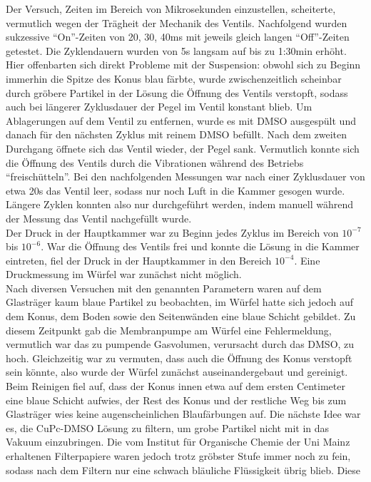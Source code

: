 Der Versuch, Zeiten im Bereich von Mikrosekunden einzustellen, scheiterte, vermutlich wegen der Trägheit der
Mechanik des Ventils. Nachfolgend wurden sukzessive "`On"'-Zeiten von 20, 30, 40ms mit jeweils gleich langen
"`Off"'-Zeiten getestet. Die Zyklendauern wurden von 5s langsam auf bis zu 1:30min erhöht. Hier offenbarten
sich direkt Probleme mit der Suspension: obwohl sich zu Beginn immerhin die Spitze des Konus blau färbte,
wurde zwischenzeitlich scheinbar durch gröbere Partikel in der Lösung die Öffnung des Ventils verstopft,
sodass auch bei längerer Zyklusdauer der Pegel im Ventil konstant blieb. Um Ablagerungen auf dem Ventil zu
entfernen, wurde es mit DMSO ausgespült und danach für den nächsten Zyklus mit reinem DMSO befüllt. Nach dem
zweiten Durchgang öffnete sich das Ventil wieder, der Pegel sank. Vermutlich konnte sich die Öffnung des
Ventils durch die Vibrationen während des Betriebs "`freischütteln"'. Bei den nachfolgenden Messungen war
nach einer Zyklusdauer von etwa 20s das Ventil leer, sodass nur noch Luft in die Kammer gesogen wurde. Längere
Zyklen konnten also nur durchgeführt werden, indem manuell während der Messung das Ventil nachgefüllt wurde.
\\
Der Druck in der Hauptkammer war zu Beginn jedes Zyklus im Bereich von $10^{-7}$ bis $10^{-6}$. War die
Öffnung des Ventils frei und konnte die Lösung in die Kammer eintreten, fiel der Druck in der Hauptkammer in
den Bereich $10^{-4}$. Eine Druckmessung im Würfel war zunächst nicht möglich.\\
Nach diversen Versuchen mit den genannten Parametern waren auf dem Glasträger kaum blaue Partikel zu
beobachten, im Würfel hatte sich jedoch auf dem Konus, dem Boden sowie den Seitenwänden eine blaue Schicht
gebildet. Zu diesem Zeitpunkt gab die Membranpumpe am Würfel eine Fehlermeldung, vermutlich war das
zu pumpende Gasvolumen, verursacht durch das DMSO, zu hoch. Gleichzeitig war zu vermuten, dass auch die
Öffnung des Konus verstopft sein könnte, also wurde der Würfel zunächst auseinandergebaut und gereinigt.\\
Beim Reinigen fiel auf, dass der Konus innen etwa auf dem ersten Centimeter eine blaue Schicht aufwies, der
Rest des Konus und der restliche Weg bis zum Glasträger wies keine augenscheinlichen Blaufärbungen auf. Die
nächste Idee war es, die CuPc-DMSO Lösung zu filtern, um grobe Partikel nicht mit in das Vakuum einzubringen.
Die vom Institut für Organische Chemie der Uni Mainz erhaltenen Filterpapiere waren jedoch  trotz gröbster
Stufe immer noch zu fein, sodass nach dem Filtern nur eine schwach bläuliche Flüssigkeit übrig blieb. Diese
